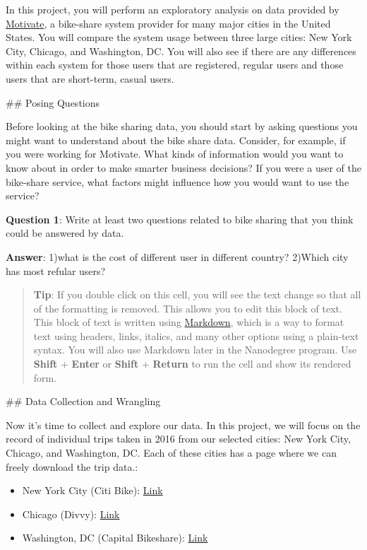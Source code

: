 \documentclass[11pt]{article}
\providecommand{\tightlist}{%
      \setlength{\itemsep}{0pt}\setlength{\parskip}{0pt}}
\begin{document}
In this project, you will perform an exploratory analysis on data
provided by \href{https://www.motivateco.com/}{Motivate}, a bike-share
system provider for many major cities in the United States. You will
compare the system usage between three large cities: New York City,
Chicago, and Washington, DC. You will also see if there are any
differences within each system for those users that are registered,
regular users and those users that are short-term, casual users.

     \#\# Posing Questions

Before looking at the bike sharing data, you should start by asking
questions you might want to understand about the bike share data.
Consider, for example, if you were working for Motivate. What kinds of
information would you want to know about in order to make smarter
business decisions? If you were a user of the bike-share service, what
factors might influence how you would want to use the service?

\textbf{Question 1}: Write at least two questions related to bike
sharing that you think could be answered by data.

\textbf{Answer}: 1)what is the cost of different user in different
country? 2)Which city has most refular users?

\begin{quote}
\textbf{Tip}: If you double click on this cell, you will see the text
change so that all of the formatting is removed. This allows you to edit
this block of text. This block of text is written using
\href{http://daringfireball.net/projects/markdown/syntax}{Markdown},
which is a way to format text using headers, links, italics, and many
other options using a plain-text syntax. You will also use Markdown
later in the Nanodegree program. Use \textbf{Shift} + \textbf{Enter} or
\textbf{Shift} + \textbf{Return} to run the cell and show its rendered
form.
\end{quote}

     \#\# Data Collection and Wrangling

Now it's time to collect and explore our data. In this project, we will
focus on the record of individual trips taken in 2016 from our selected
cities: New York City, Chicago, and Washington, DC. Each of these cities
has a page where we can freely download the trip data.:

\begin{itemize}
\tightlist
\item
  New York City (Citi Bike):
  \href{https://www.citibikenyc.com/system-data}{Link}
\item
  Chicago (Divvy): \href{https://www.divvybikes.com/system-data}{Link}
\item
  Washington, DC (Capital Bikeshare):
  \href{https://www.capitalbikeshare.com/system-data}{Link}
\end{itemize}
\end{document}
